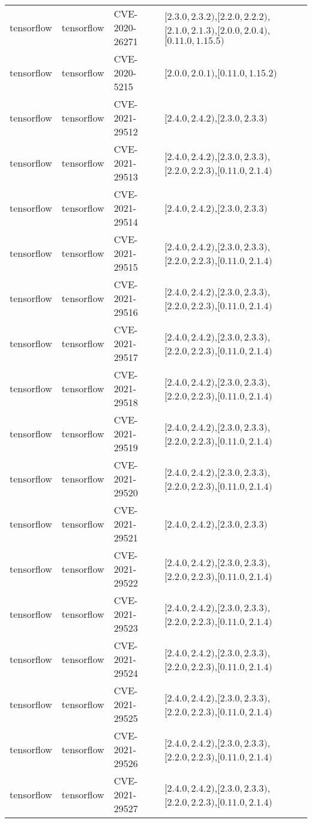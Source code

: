 \begin{tabular}{llll}
tensorflow & tensorflow & CVE-2020-26271 & $[2.3.0,2.3.2)$,$[2.2.0,2.2.2)$,$[2.1.0,2.1.3)$,$[2.0.0,2.0.4)$,$[0.11.0,1.15.5)$ \\
tensorflow & tensorflow & CVE-2020-5215 & $[2.0.0,2.0.1)$,$[0.11.0,1.15.2)$ \\
tensorflow & tensorflow & CVE-2021-29512 & $[2.4.0,2.4.2)$,$[2.3.0,2.3.3)$ \\
tensorflow & tensorflow & CVE-2021-29513 & $[2.4.0,2.4.2)$,$[2.3.0,2.3.3)$,$[2.2.0,2.2.3)$,$[0.11.0,2.1.4)$ \\
tensorflow & tensorflow & CVE-2021-29514 & $[2.4.0,2.4.2)$,$[2.3.0,2.3.3)$ \\
tensorflow & tensorflow & CVE-2021-29515 & $[2.4.0,2.4.2)$,$[2.3.0,2.3.3)$,$[2.2.0,2.2.3)$,$[0.11.0,2.1.4)$ \\
tensorflow & tensorflow & CVE-2021-29516 & $[2.4.0,2.4.2)$,$[2.3.0,2.3.3)$,$[2.2.0,2.2.3)$,$[0.11.0,2.1.4)$ \\
tensorflow & tensorflow & CVE-2021-29517 & $[2.4.0,2.4.2)$,$[2.3.0,2.3.3)$,$[2.2.0,2.2.3)$,$[0.11.0,2.1.4)$ \\
tensorflow & tensorflow & CVE-2021-29518 & $[2.4.0,2.4.2)$,$[2.3.0,2.3.3)$,$[2.2.0,2.2.3)$,$[0.11.0,2.1.4)$ \\
tensorflow & tensorflow & CVE-2021-29519 & $[2.4.0,2.4.2)$,$[2.3.0,2.3.3)$,$[2.2.0,2.2.3)$,$[0.11.0,2.1.4)$ \\
tensorflow & tensorflow & CVE-2021-29520 & $[2.4.0,2.4.2)$,$[2.3.0,2.3.3)$,$[2.2.0,2.2.3)$,$[0.11.0,2.1.4)$ \\
tensorflow & tensorflow & CVE-2021-29521 & $[2.4.0,2.4.2)$,$[2.3.0,2.3.3)$ \\
tensorflow & tensorflow & CVE-2021-29522 & $[2.4.0,2.4.2)$,$[2.3.0,2.3.3)$,$[2.2.0,2.2.3)$,$[0.11.0,2.1.4)$ \\
tensorflow & tensorflow & CVE-2021-29523 & $[2.4.0,2.4.2)$,$[2.3.0,2.3.3)$,$[2.2.0,2.2.3)$,$[0.11.0,2.1.4)$ \\
tensorflow & tensorflow & CVE-2021-29524 & $[2.4.0,2.4.2)$,$[2.3.0,2.3.3)$,$[2.2.0,2.2.3)$,$[0.11.0,2.1.4)$ \\
tensorflow & tensorflow & CVE-2021-29525 & $[2.4.0,2.4.2)$,$[2.3.0,2.3.3)$,$[2.2.0,2.2.3)$,$[0.11.0,2.1.4)$ \\
tensorflow & tensorflow & CVE-2021-29526 & $[2.4.0,2.4.2)$,$[2.3.0,2.3.3)$,$[2.2.0,2.2.3)$,$[0.11.0,2.1.4)$ \\
tensorflow & tensorflow & CVE-2021-29527 & $[2.4.0,2.4.2)$,$[2.3.0,2.3.3)$,$[2.2.0,2.2.3)$,$[0.11.0,2.1.4)$ \\

\end{tabular}
